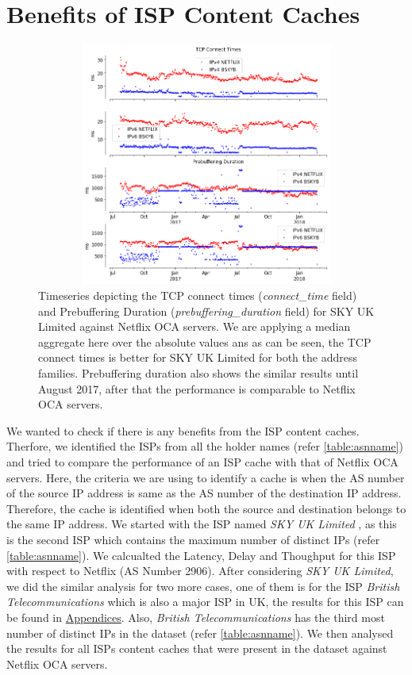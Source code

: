 \hypersetup{linkcolor=blue}
\chapter{Benefits of ISP Content Caches}\label{chapter:5}

\begin{figure}[!ht]
	\centering
	\includegraphics[keepaspectratio, height=8cm, width=15cm]{figures/cache/bskyb/netflix-tcp-pd-delay-timeseries-asn-5607-separate.png}
	\caption[SKY UK TCP Connect Times and Pre-Buffering Duration Timeseries Absolute]{Timeseries depicting the TCP connect times (\textit{connect\_time} field) and Prebuffering Duration (\textit{prebuffering\_duration} field) for SKY UK Limited against Netflix OCA servers. 
	We are applying a median aggregate here over the absolute values ans as can be seen, the TCP connect times is better for SKY UK Limited for both the address families. Prebuffering duration also shows the similar
	results until August 2017, after that the performance is comparable to Netflix OCA servers.}
	\label{fig: SKY UK TCP Connect Times and Pre-Buffering Duration Timeseries Absolute}
\end{figure}

We wanted to check if there is any benefits from the ISP content caches. Therfore, we identified the ISPs from all the holder names (refer \cref{table:asnname}) and tried to compare the performance
of an ISP cache with that of Netflix OCA servers. Here, the criteria we are using to identify a cache is when the AS number of the source IP address is same as the AS number of the destination IP address.
Therefore, the cache is identified when both the source and destination belongs to the same IP address. We started with the ISP named \textit{SKY UK Limited} \cite{skyuk}, as this is the
second ISP which contains the maximum number of distinct IPs (refer \cref{table:asnname}). We calcualted the Latency, Delay and Thoughput for this ISP with respect to Netflix (AS Number 2906).
After considering \textit{SKY UK Limited}, we did the similar analysis for two more cases, one of them is for the ISP \textit{British Telecommunications} \cite{btuk} which is also a major ISP in UK, the results for this ISP can be found in \hyperref[chapter:appendix]{Appendices}.
Also, \textit{British Telecommunications} has the third most number of distinct IPs in the dataset (refer \cref{table:asnname}). We then analysed the results for all ISPs content caches that were present in the dataset
against Netflix OCA servers.

